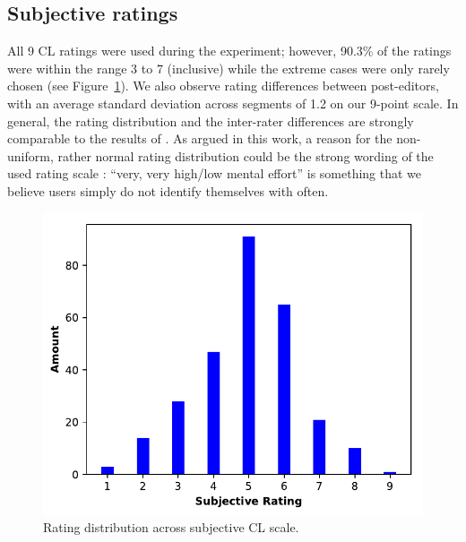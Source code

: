 \documentclass[output=paper]{langsci/langscibook}
\begin{document}
\subsection{Subjective ratings}\label{sec:subjRatings}

All 9 CL ratings were used during the experiment; however, 90.3\% of the ratings were within the range 3 to 7 (inclusive) while the extreme cases were only rarely chosen (see Figure~\ref{fig:segments_by_rating}).
We also observe rating differences between post-editors, with an average standard deviation across segments of 1.2 %
on our 9-point scale. %
In general, the rating distribution and the inter-rater differences are strongly comparable to the results of \citet{herbig2019mt}.
As argued in this work, a reason for the non-uniform, rather normal rating distribution could be the strong wording of the used rating scale \citep{paas1994instructional}: ``very, very high/low mental effort'' is something that we believe users simply do not identify themselves with often.

\begin{figure}
\includegraphics[scale=0.5]{figures/rating_dist.pdf}
\caption{Rating distribution across subjective CL scale.\label{fig:segments_by_rating}}
\end{figure}
\end{document}

